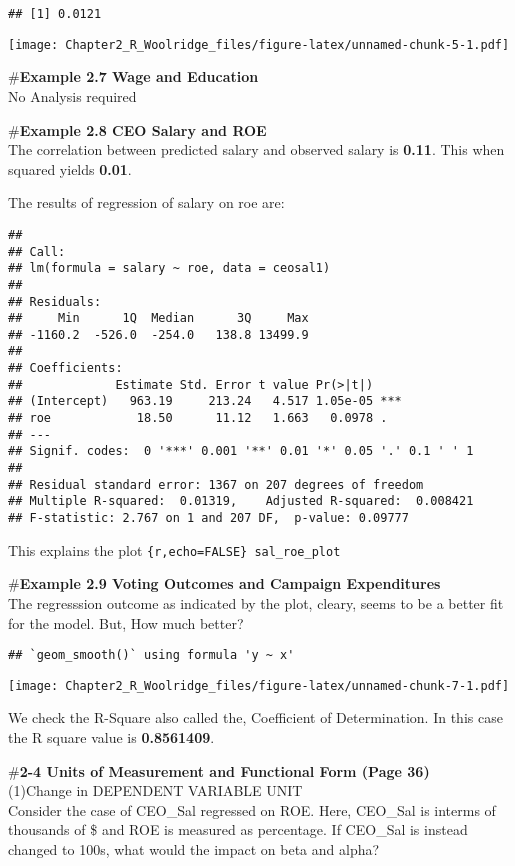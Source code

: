 \documentclass[
]{article}
\begin{document}
\begin{verbatim}
## [1] 0.0121
\end{verbatim}

\texttt{[image: Chapter2\_R\_Woolridge\_files/figure-latex/unnamed-chunk-5-1.pdf]}

\#\textbf{Example 2.7 Wage and Education}\\
No Analysis required

\#\textbf{Example 2.8 CEO Salary and ROE}\\
The correlation between predicted salary and observed salary is
\textbf{0.11}. This when squared yields \textbf{0.01}.

The results of regression of salary on roe are:

\begin{verbatim}
## 
## Call:
## lm(formula = salary ~ roe, data = ceosal1)
## 
## Residuals:
##     Min      1Q  Median      3Q     Max 
## -1160.2  -526.0  -254.0   138.8 13499.9 
## 
## Coefficients:
##             Estimate Std. Error t value Pr(>|t|)    
## (Intercept)   963.19     213.24   4.517 1.05e-05 ***
## roe            18.50      11.12   1.663   0.0978 .  
## ---
## Signif. codes:  0 '***' 0.001 '**' 0.01 '*' 0.05 '.' 0.1 ' ' 1
## 
## Residual standard error: 1367 on 207 degrees of freedom
## Multiple R-squared:  0.01319,    Adjusted R-squared:  0.008421 
## F-statistic: 2.767 on 1 and 207 DF,  p-value: 0.09777
\end{verbatim}

This explains the plot \texttt{\{r,echo=FALSE\}\ sal\_roe\_plot}

\#\textbf{Example 2.9 Voting Outcomes and Campaign Expenditures}\\
The regresssion outcome as indicated by the plot, cleary, seems to be a
better fit for the model. { But, How much better?}

\begin{verbatim}
## `geom_smooth()` using formula 'y ~ x'
\end{verbatim}

\texttt{[image: Chapter2\_R\_Woolridge\_files/figure-latex/unnamed-chunk-7-1.pdf]}

We check the R-Square also called the, Coefficient of Determination. In
this case the R square value is \textbf{0.8561409}.

\#\textbf{2-4 Units of Measurement and Functional Form (Page 36)}\\
(1)Change in DEPENDENT VARIABLE UNIT\\
Consider the case of CEO\_Sal regressed on ROE. Here, CEO\_Sal is
interms of thousands of \$ and ROE is measured as percentage. If
CEO\_Sal is instead changed to 100s, what would the impact on beta and
alpha?
\end{document}
